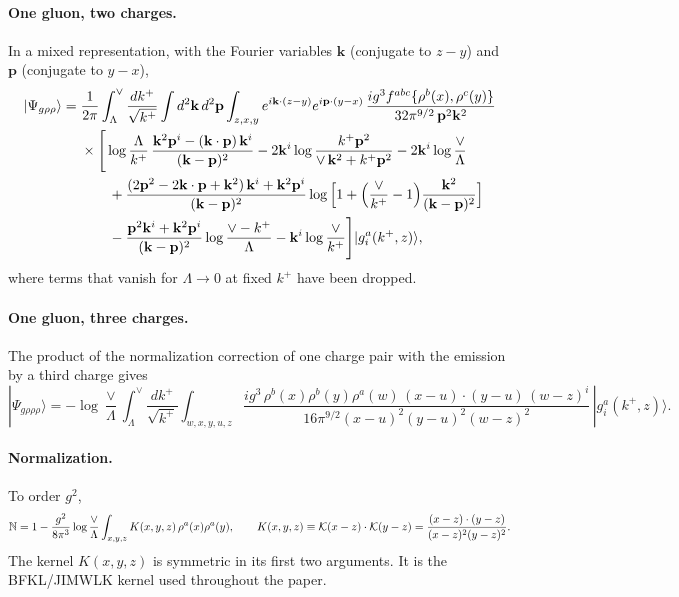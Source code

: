 \paragraph*{One gluon, two charges.} In a mixed representation, with the Fourier variables $\mathbf k$ (conjugate to $z-y$) and $\mathbf p$ (conjugate to $y-x$),
\begin{align}
|\Psi_{g\rho\rho}\rangle={}&\frac{1}{2\pi}\int_{\Lambda}^{\vee}\frac{dk^+}{\sqrt{k^+}}\int d^2\mathbf k\,d^2\mathbf p\int_{z,x,y}e^{i\mathbf k\cdot(z-y)}e^{i\mathbf p\cdot(y-x)}\,\frac{ig^3f^{abc}\{\rho^b(x),\rho^c(y)\}}{32\pi^{9/2}\,\mathbf p^2\mathbf k^2}\notag\\
&\times\Bigg[\log\frac{\Lambda}{k^+}\,\frac{\mathbf k^2\mathbf p^i-(\mathbf k\cdot\mathbf p)\,\mathbf k^i}{(\mathbf k-\mathbf p)^2}-2\mathbf k^i\log\frac{k^+\mathbf p^2}{\vee\,\mathbf k^2+k^+\mathbf p^2}-2\mathbf k^i\log\frac{\vee}{\Lambda}\notag\\
&\qquad+\frac{(2\mathbf p^2-2\mathbf k\cdot\mathbf p+\mathbf k^2)\,\mathbf k^i+\mathbf k^2\mathbf p^i}{(\mathbf k-\mathbf p)^2}\log\Big[1+\Big(\frac{\vee}{k^+}-1\Big)\frac{\mathbf k^2}{(\mathbf k-\mathbf p)^2}\Big]\notag\\
&\qquad-\frac{\mathbf p^2\mathbf k^i+\mathbf k^2\mathbf p^i}{(\mathbf k-\mathbf p)^2}\log\frac{\vee-k^+}{\Lambda}-\mathbf k^i\log\frac{\vee}{k^+}\Bigg]|g^a_i(k^+,z)\rangle ,
\label{eq:grhorho}
\end{align}
where terms that vanish for $\Lambda\to0$ at fixed $k^+$ have been dropped.

\paragraph*{One gluon, three charges.} The product of the normalization correction of one charge pair with the emission by a third charge gives
\begin{equation}
|\Psi_{g\rho\rho\rho}\rangle=-\log\frac{\vee}{\Lambda}\int_{\Lambda}^{\vee}\frac{dk^+}{\sqrt{k^+}}\int_{w,x,y,u,z}\frac{ig^3\,\rho^b(x)\rho^b(y)\rho^a(w)\,(x-u)\cdot(y-u)\,(w-z)^i}{16\pi^{9/2}(x-u)^2(y-u)^2(w-z)^2}\,|g^a_i(k^+,z)\rangle .
\label{eq:grhorhorho}
\end{equation}

\paragraph*{Normalization.} To order $g^2$,
\begin{equation}
\mathbb{N}=1-\frac{g^2}{8\pi^3}\log\frac{\vee}{\Lambda}\int_{x,y,z}K(x,y,z)\,\rho^a(x)\rho^a(y),\qquad K(x,y,z)\equiv\mathcal{K}(x-z)\cdot\mathcal{K}(y-z)=\frac{(x-z)\cdot(y-z)}{(x-z)^2(y-z)^2}.
\label{eq:NX}
\end{equation}
The kernel $K(x,y,z)$ is symmetric in its first two arguments. It is the BFKL/JIMWLK kernel used throughout the paper.


